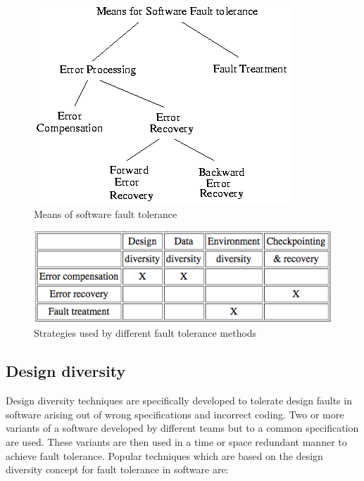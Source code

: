 \documentclass[oneside, a4paper, 11pt]{memoir}
\begin{document}
\begin{figure}[htbp]
	\centering
	\includegraphics[width=0.6\linewidth]{images/img3.png}
	\caption{Means of software fault tolerance}
\end{figure}

\begin{figure}[htbp]
	\centering
	\includegraphics[width=0.6\linewidth]{images/table1.png}
	\caption{Strategies used by different fault tolerance methods}
\end{figure}

\subsection{Design diversity}
Design diversity techniques are specifically developed to tolerate design faults in software arising out of wrong specifications and incorrect coding. Two or more variants of a software developed by different teams but to a common specification are used. These variants are then used in a time or space redundant manner to achieve fault tolerance. Popular techniques which are based on the design diversity concept for fault tolerance in software are:
\end{document}
